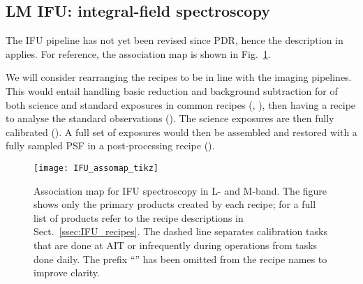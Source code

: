 \subsection{LM IFU: integral-field spectroscopy}
\label{ssec:overview_ifu}

The \ac{IFU} pipeline has not yet been revised since PDR, hence the
description in \cite{DRLS} applies. For reference, the association map
is shown in Fig.~\ref{Fig:IfuAssomap}.

We will consider rearranging the recipes to be in line with the
imaging pipelines. This would entail handling basic reduction and
background subtraction for of both science and standard exposures in
common recipes (, ),
then having a recipe to analyse the standard observations
(). The science exposures are then fully
calibrated (). A full set of exposures would
then be assembled and restored with a fully sampled PSF in a
post-processing recipe ().

\begin{landscape}
\begin{figure}[ht]
  \centering
  \texttt{[image: IFU\_assomap\_tikz]}
  \caption[Reduction cascade and association map for IFU
  spectroscopy]{%
    Association map for \ac{IFU} spectroscopy in L- and M-band. The
    figure shows only the primary products created by each recipe; for
    a full list of products refer to the recipe descriptions in
    Sect.~\ref{ssec:IFU_recipes}. The dashed line separates
    calibration tasks that are done at AIT or infrequently during
    operations from tasks done daily. The prefix ``'' has been
    omitted from the recipe names to improve clarity.}
  \label{Fig:IfuAssomap}
\end{figure}
\end{landscape}




